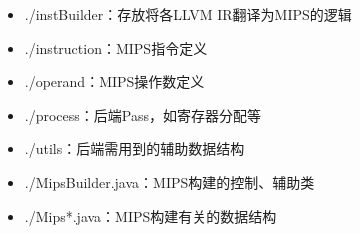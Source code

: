 \begin{itemize}
\begin{itemize}
        \item ./instBuilder：存放将各LLVM IR翻译为MIPS的逻辑
        \item ./instruction：MIPS指令定义
        \item ./operand：MIPS操作数定义
        \item ./process：后端Pass，如寄存器分配等
        \item ./utils：后端需用到的辅助数据结构
        \item ./MipsBuilder.java：MIPS构建的控制、辅助类
        \item ./Mips*.java：MIPS构建有关的数据结构
    \end{itemize}
\end{itemize}